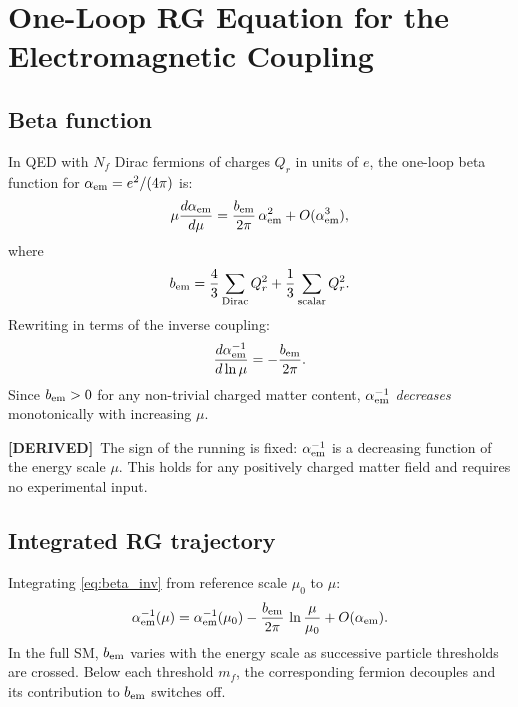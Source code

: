 \documentclass[12pt,a4paper]{article}
\theoremstyle{definition}
\theoremstyle{remark}
\newcommand{\der}{\textcolor{green!55!black}{\textbf{[DERIVED]}}}
\begin{document}
\section{One-Loop RG Equation for the Electromagnetic Coupling}

\subsection{Beta function}

In QED with $N_f$ Dirac fermions of charges $Q_r$ in units of $e$, the
one-loop beta function for $\alpha_{\rm em} = e^2/(4\pi)$ is:
\begin{equation}
  \mu \frac{d\alpha_{\rm em}}{d\mu}
  = \frac{b_{\rm em}}{2\pi}\,\alpha_{\rm em}^2 + O(\alpha_{\rm em}^3),
  \label{eq:beta_alpha}
\end{equation}
where
\begin{equation}
  b_{\rm em} = \frac{4}{3}\sum_{\text{Dirac}} Q_r^2
             + \frac{1}{3}\sum_{\text{scalar}} Q_r^2.
  \label{eq:bem}
\end{equation}
Rewriting in terms of the inverse coupling:
\begin{equation}
  \frac{d\alpha_{\rm em}^{-1}}{d\ln\mu} = -\frac{b_{\rm em}}{2\pi}.
  \label{eq:beta_inv}
\end{equation}
Since $b_{\rm em} > 0$ for any non-trivial charged matter content,
$\alpha_{\rm em}^{-1}$ \emph{decreases} monotonically with increasing $\mu$.

\begin{resultbox}
\der\ The sign of the running is fixed: $\alpha_{\rm em}^{-1}$ is a
decreasing function of the energy scale $\mu$.  This holds for any positively
charged matter field and requires no experimental input.
\end{resultbox}

\subsection{Integrated RG trajectory}

Integrating \eqref{eq:beta_inv} from reference scale $\mu_0$ to $\mu$:
\begin{equation}
  \alpha_{\rm em}^{-1}(\mu)
  = \alpha_{\rm em}^{-1}(\mu_0)
  - \frac{b_{\rm em}}{2\pi}\,\ln\frac{\mu}{\mu_0}
  + O(\alpha_{\rm em}).
  \label{eq:rg_solution}
\end{equation}
In the full SM, $b_{\rm em}$ varies with the energy scale as successive
particle thresholds are crossed.  Below each threshold $m_f$, the
corresponding fermion decouples and its contribution to $b_{\rm em}$ switches
off.
\end{document}
